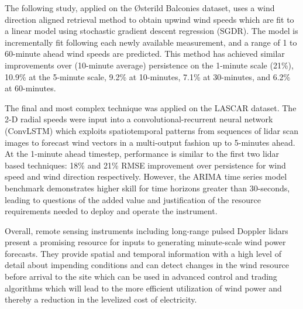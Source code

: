 The following study, applied on the {\O}sterild Balconies dataset, uses a wind direction aligned retrieval method to obtain upwind wind speeds which are fit to a linear model using stochastic gradient descent regression (SGDR). The model is incrementally fit following each newly available measurement, and a range of 1 to 60-minute ahead wind speeds are predicted. This method has achieved similar improvements over (10-minute average) persistence on the 1-minute scale (21\%), 10.9\% at the 5-minute scale, 9.2\% at 10-minutes, 7.1\% at 30-minutes, and 6.2\% at 60-minutes. 

The final and most complex technique was applied on the LASCAR dataset. The 2-D radial speeds were input into a convolutional-recurrent neural network (ConvLSTM) which exploits spatiotemporal patterns from sequences of lidar scan images to forecast wind vectors in a multi-output fashion up to 5-minutes ahead. At the 1-minute ahead timestep, performance is similar to the first two lidar based techniques: 18\% and 21\% RMSE improvement over persistence for wind speed and wind direction respectively. However, the ARIMA time series model benchmark demonstrates higher skill for time horizons greater than 30-seconds, leading to questions of the added value and justification of the resource requirements needed to deploy and operate the instrument.

Overall, remote sensing instruments including long-range pulsed Doppler lidars present a promising resource for inputs to generating minute-scale wind power forecasts. They provide spatial and temporal information with a high level of detail about impending conditions and can detect changes in the wind resource before arrival to the site which can be used in advanced control and trading algorithms which will lead to the more efficient utilization of wind power and thereby a reduction in the levelized cost of electricity.


\begin{comment}
The time horizon of forecast models on these scales must be doable within this, to give automated or advisory...
-----------------------------------------------------
ts modeling vs lidar
\end{comment}

